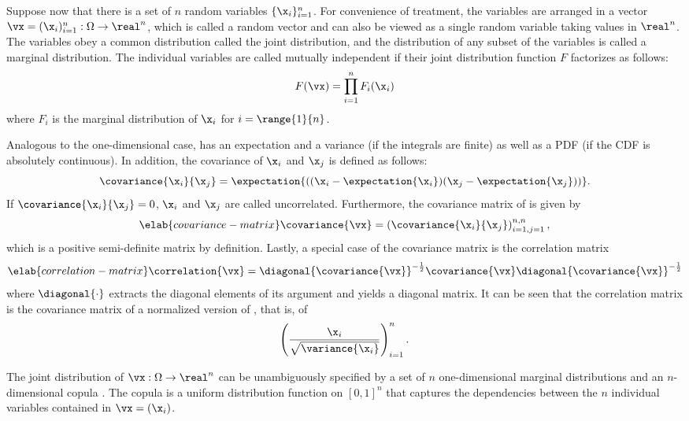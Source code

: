 Suppose now that there is a set of $n$ random variables $\{ \x_i \}_{i = 1}^n$.
For convenience of treatment, the variables are arranged in a vector $\vx =
(\x_i)_{i = 1}^n: \Omega \to \real^n$, which is called a random vector and can
also be viewed as a single random variable taking values in $\real^n$. The
variables obey a common distribution called the joint distribution, and the
distribution of any subset of the variables is called a marginal distribution.
The individual variables are called mutually independent if their joint
distribution function $F$ factorizes as follows:
\[
  F(\vx) = \prod_{i = 1}^n F_i(\x_i)
\]
where $F_i$ is the marginal distribution of $\x_i$ for $i = \range{1}{n}$.

Analogous to the one-dimensional case, \vx has an expectation and a variance (if
the integrals are finite) as well as a \ac{PDF} (if the \ac{CDF} is absolutely
continuous). In addition, the covariance of $\x_i$ and $\x_j$ is defined as
follows:
\[
  \covariance{\x_i}{\x_j} = \expectation{((\x_i - \expectation{\x_i})(\x_j - \expectation{\x_j}))}.
\]
If $\covariance{\x_i}{\x_j} = 0$, $\x_i$ and $\x_j$ are called uncorrelated.
Furthermore, the covariance matrix of \vx is given by
\begin{equation} \elab{covariance-matrix}
  \covariance{\vx} = \left(\covariance{\x_i}{\x_j}\right)_{i = 1, j = 1}^{n, n},
\end{equation}
which is a positive semi-definite matrix by definition. Lastly, a special case
of the covariance matrix is the correlation matrix
\begin{equation} \elab{correlation-matrix}
  \correlation{\vx} = \diagonal{\covariance{\vx}}^{-\frac{1}{2}} \covariance{\vx} \diagonal{\covariance{\vx}}^{-\frac{1}{2}}
\end{equation}
where $\diagonal{\cdot}$ extracts the diagonal elements of its argument and
yields a diagonal matrix. It can be seen that the correlation matrix is the
covariance matrix of a normalized version of \vx, that is, of
\[
  \left(\frac{\x_i}{\sqrt{\variance{\x_i}}}\right)_{i = 1}^n.
\]

The joint distribution of $\vx: \Omega \to \real^n$ can be unambiguously
specified by a set of $n$ one-dimensional marginal distributions and an
$n$-dimensional copula \cite{nelsen2006}. The copula is a uniform distribution
function on $[0, 1]^n$ that captures the dependencies between the $n$ individual
variables contained in $\vx = (\x_i)$.
